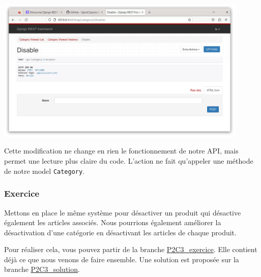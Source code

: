 \documentclass[a4paper]{article}
\begin{document}
\begin{center}
\includegraphics[width=12cm]{images/image20.png}
\end{center}


\begin{theorem}
Cette modification ne change en rien le fonctionnement de notre API, mais permet une {\color{monOrange}lecture} plus claire du code. L’action ne fait qu'appeler une méthode de notre model {\tt Category}.
\end{theorem}

\subsubsection*{Exercice}
Mettons en place le même système pour {\color{monOrange}désactiver un produit} qui {\color{monOrange}désactive également les articles associés}. Nous pourrions également améliorer la désactivation d’une catégorie en désactivant les articles de chaque produit.

Pour réaliser cela, vous pouvez partir de la branche \href{https://github.com/OpenClassrooms-Student-Center/7192416\_APIs\_DRF/tree/P2C3\_exercice}{P2C3\_exercice}. Elle contient déjà ce que nous venons de faire ensemble. Une solution est proposée sur la branche \href{https://github.com/OpenClassrooms-Student-Center/7192416\_APIs\_DRF/tree/P2C3\_solution}{P2C3\_solution}.
\end{document}
